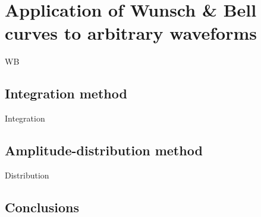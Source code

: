 \section{Application of Wunsch & Bell curves to arbitrary waveforms}
\label{sec:wb-for-arbitrary-wvfs}

WB



\subsection{Integration method}

Integration



\subsection{Amplitude-distribution method}

Distribution



%

\subsection{Conclusions}

